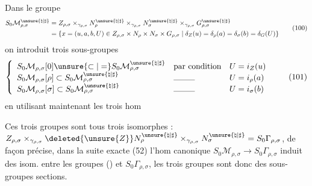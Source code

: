 Dans le groupe 
\[
\begin{aligned}
S_0\mathcal{M}_{\rho,\sigma}^{\unsure{\natural|\sharp}}
&=Z_{\rho,\sigma}\times_{\gamma_{\rho,\sigma}}
N_\rho^{\unsure{\natural|\sharp}}\times_{\gamma_{\rho,\sigma}}
N_\sigma^{\unsure{\natural|\sharp}}\times_{\gamma_{\rho,\sigma}}
G_{\rho,\sigma}^{\unsure{\natural|\sharp}}\\
&=\left\{x=(u,a,b,U)\in Z_{\rho,\sigma}\times N_\rho\times N_\sigma\times G_{\rho,\sigma}
\;\middle|\;\delta_Z(u)=\delta_\rho(a)=\delta_\sigma(b)=\delta_G(U)\right\}
\end{aligned}
\tag{100}
\]
on introduit trois sous-groupes
\[
\left\{
\begin{array}{lll}
S_0\mathcal{M}_{\rho,\sigma}[0]\unsure{\subset|=}S_0\mathcal{M}_{\rho,\sigma}^{\unsure{\natural|\sharp}}
&\text{par condition}& U=i_Z(u)\\
S_0\mathcal{M}_{\rho,\sigma}[\rho]\subset S_0\mathcal{M}_{\rho,\sigma}^{\unsure{\natural|\sharp}}
&\text{\rule{2.6em}{0.3pt}}& U=i_\rho(a)\\
S_0\mathcal{M}_{\rho,\sigma}[\sigma]\subset S_0\mathcal{M}_{\rho,\sigma}^{\unsure{\natural|\sharp}}
&\text{\rule{2.6em}{0.3pt}}& U=i_\sigma(b)
\end{array}\right.
\tag{101}
\]
en utilisant maintenant les trois hom 

Ces trois groupes sont  tous trois isomorphes :
$Z_{\rho,\sigma}\times_{\gamma_{\rho,\sigma}}
\deleted{\unsure{Z}}N_\rho^{\unsure{\natural|\sharp}}\times_{\gamma_{\rho,\sigma}}
N_\sigma^{\unsure{\natural|\sharp}}=S_0\Gamma_{\rho,\sigma}$,
de façon précise, dans la suite exacte (52)
l'hom canonique
$S_0\mathcal{M}_{\rho,\sigma}\longrightarrow S_0\Gamma_{\rho,\sigma}$
induit des isom. entre les groupes () et $S_0\Gamma_{\rho,\sigma}$, les trois groupes sont donc des sous-groupes sections.

